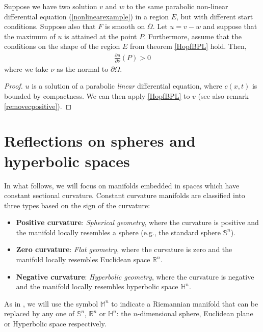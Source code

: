 \begin{proposition}
	\label{secondapplication}
	Suppose we have two solution $v$ and $w$ to the same parabolic non-linear differential equation (\ref{nonlinearexample}) in a region $E$, but with different start conditions. Suppose also that $F$ is smooth on  $\overline{\Omega}$. Let $u=v-w$ and suppose that the maximum of $u$ is attained at the point $P$. Furthermore, assume that the conditions on the shape of the region $E$ from theorem \ref{HopfBPL} hold. Then, 
	\begin{align*}
		\frac{\partial u}{\partial \nu}(P) >0
	\end{align*}
	where we take $\nu$ as the normal to $\partial\Omega$.
\end{proposition}

\begin{proof}
	$u$ is a solution of a parabolic \textit{linear} differential equation, where  $c(x, t)$ is bounded by compactness. We can then apply \ref{HopfBPL} to $v$ (see also remark \ref{removecpositive}).
\end{proof}

\section{Reflections on spheres and hyperbolic spaces}	
\label{reflections definitions}

In what follows, we will focus on manifolds embedded in spaces which have constant sectional curvature. Constant curvature manifolds are classified into three types based on the sign of the curvature:
\begin{itemize}
	\item \textbf{Positive curvature}: \textit{Spherical geometry}, where the curvature is positive and the manifold locally resembles a sphere (e.g., the standard sphere $\mathbb{S}^n$).
	\item \textbf{Zero curvature}: \textit{Flat geometry}, where the curvature is zero and the manifold locally resembles Euclidean space $\mathbb{R}^n$.
	\item \textbf{Negative curvature}: \textit{Hyperbolic geometry}, where the curvature is negative and the manifold locally resembles hyperbolic space $\mathbb{H}^n$.
\end{itemize}

As in \cite{italiani}, we will use the symbol $\mathbb{M}^n$ to indicate a Riemannian manifold that can be replaced by any one of  $\mathbb{S}^n$, $\mathbb{R}^n$ or $\mathbb{H}^n$: the $n$-dimensional sphere, Euclidean plane or Hyperbolic space respectively. 

